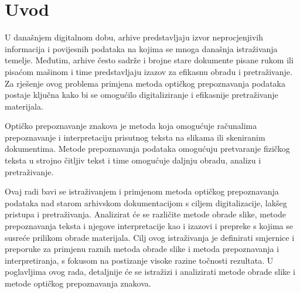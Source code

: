 \documentclass[times, utf8, zavrsni, numeric]{fer}
\begin{document}
\tableofcontents

\listoffigures

\listoftables

\chapter{Uvod}
U današnjem digitalnom dobu, arhive predstavljaju izvor neprocjenjivih informacija i povijesnih podataka na kojima se mnoga današnja istraživanja temelje. Međutim, arhive često sadrže i brojne stare dokumente pisane rukom ili pisaćom mašinom i time predstavljaju izazov za efikasnu obradu i pretraživanje. Za rješenje ovog problema primjena metoda optičkog prepoznavanja podataka postaje ključna kako bi se omogućilo digitaliziranje i efikasnije pretraživanje materijala.

Optičko prepoznavanje znakova je metoda koja omogućuje računalima prepoznavanje i interpretaciju prisutnog teksta na slikama ili skeniranim dokumentima. Metode prepoznavanja podataka omogućuju pretvaranje fizičkog teksta u strojno čitljiv tekst i time omogućuje daljnju obradu, analizu i pretraživanje.

Ovaj radi bavi se istraživanjem i primjenom metoda optičkog prepoznavanja podataka nad starom arhivskom dokumentacijom s ciljem digitalizacije, lakšeg pristupa i pretraživanja. Analizirat će se različite metode obrade slike, metode prepoznavanja teksta i njegove interpretacije kao i izazovi i prepreke s kojima se susreće prilikom obrade materijala.
Cilj ovog istraživanja je definirati smjernice i preporuke za primjenu raznih metoda obrade slike i metoda prepoznavanja i interpretiranja, s fokusom na postizanje visoke razine točnosti rezultata.
U poglavljima ovog rada, detaljnije će se istražizi i analizirati metode obrade slike i metode optičkog prepoznavanja znakova.
\pagebreak
\end{document}

